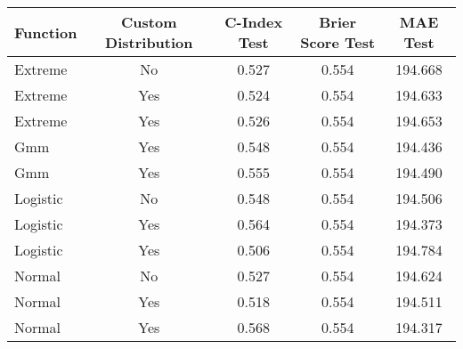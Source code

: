 \begin{tabular}{lcccc}
\toprule
Function & Custom Distribution & C-Index Test & Brier Score Test & MAE Test \\
\midrule
Extreme & No & 0.527 & 0.554 & 194.668 \\
Extreme & Yes & 0.524 & 0.554 & 194.633 \\
Extreme & Yes & 0.526 & 0.554 & 194.653 \\
Gmm & Yes & 0.548 & 0.554 & 194.436 \\
Gmm & Yes & 0.555 & 0.554 & 194.490 \\
Logistic & No & 0.548 & 0.554 & 194.506 \\
Logistic & Yes & 0.564 & 0.554 & 194.373 \\
Logistic & Yes & 0.506 & 0.554 & 194.784 \\
Normal & No & 0.527 & 0.554 & 194.624 \\
Normal & Yes & 0.518 & 0.554 & 194.511 \\
Normal & Yes & 0.568 & 0.554 & 194.317 \\
\bottomrule
\end{tabular}
